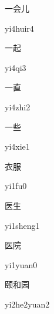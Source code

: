 \begin{multicols*}{2}
\begin{verbete}[yi4huir4]{一会儿}
\begin{pronuncia}{yi4huir4}
\end{pronuncia}
\end{verbete}

\begin{verbete}[yi4qi3]{一起}
\begin{pronuncia}{yi4qi3}
\end{pronuncia}
\end{verbete}

\begin{verbete}[yi4zhi2]{一直}
\begin{pronuncia}{yi4zhi2}
\end{pronuncia}
\end{verbete}

\begin{verbete}[yi4xie1]{一些}
\begin{pronuncia}{yi4xie1}
\end{pronuncia}
\end{verbete}

\begin{verbete}[yi1fu0]{衣服}
\begin{pronuncia}{yi1fu0}
\end{pronuncia}
\end{verbete}

\begin{verbete}[yi1sheng1]{医生}
\begin{pronuncia}{yi1sheng1}
\end{pronuncia}
\end{verbete}

\begin{verbete}[yi1yuan0]{医院}
\begin{pronuncia}{yi1yuan0}
\end{pronuncia}
\end{verbete}

\begin{verbete}[yi2he2yuan2]{颐和园}
\begin{pronuncia}{yi2he2yuan2}
\end{pronuncia}
\end{verbete}


\end{multicols*}
